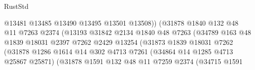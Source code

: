 \begin{lexlean}{RustStd}
\begin{coremodule}
                                            @13481
                                            @13485
                                            @13490
                                            @13495
                                            @13501
                                            @13508))
                                        (@31878
                                          @1840
                                          @132
                                          @48
                                          @11
                                          @7263
                                          @2374
                                          (@13193
                                            @31842
                                            @2134
                                            @1840
                                            @48
                                            @7263
                                            (@34789
                                              @163
                                              @48
                                              @1839
                                              @18031
                                              @2397
                                              @7262
                                              @2429
                                              @13254
                                              (@31873
                                                @1839
                                                @18031
                                                @7262
                                                (@31878
                                                  @1286
                                                  @1614
                                                  @14
                                                  @302
                                                  @4713
                                                  @7261
                                                  (@34864 @14 @1285 @4713 @25867 @25871)
                                                  (@31878
                                                    @1591
                                                    @132
                                                    @48
                                                    @11
                                                    @7259
                                                    @2374
                                                    (@34715
                                                      @1591

\end{coremodule}
\end{lexlean}
